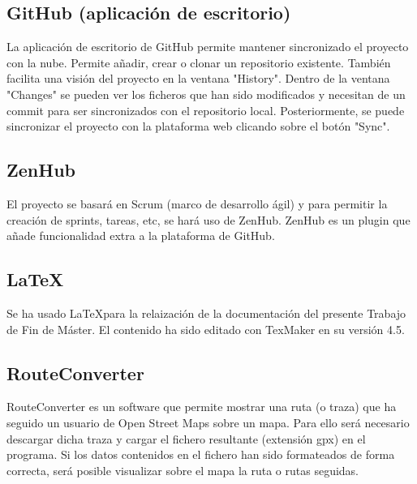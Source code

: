 \subsection{GitHub (aplicación de escritorio)}
La aplicación de escritorio de GitHub permite mantener sincronizado el proyecto con la nube. Permite añadir, crear o clonar un repositorio existente. También facilita una visión del proyecto en la ventana "History". Dentro de la ventana "Changes" se pueden ver los ficheros que han sido modificados y necesitan de un commit para ser sincronizados con el repositorio local. Posteriormente, se puede sincronizar el proyecto con la plataforma web clicando sobre el botón "Sync".

\subsection{ZenHub}
El proyecto se basará en Scrum (marco de desarrollo ágil) y para permitir la creación de sprints, tareas, etc, se hará uso de ZenHub.
ZenHub es un plugin que añade funcionalidad extra a la plataforma de GitHub.

\subsection{\LaTeX}
Se ha usado \LaTeX  para la relaización de la documentación del presente Trabajo de Fin de Máster. El contenido ha sido editado con TexMaker en su versión 4.5.

\subsection{RouteConverter}
RouteConverter es un software que permite mostrar una ruta (o traza) que ha seguido un usuario de Open Street Maps sobre un mapa. Para ello será necesario descargar dicha traza y cargar el fichero resultante (extensión gpx) en el programa. Si los datos contenidos en el fichero han sido formateados de forma correcta, será posible visualizar sobre el mapa la ruta o rutas seguidas.